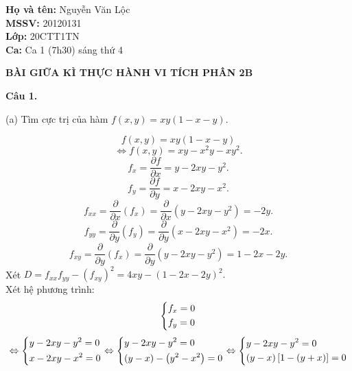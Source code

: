 \documentclass[12pt,a4paper]{article}
\author{Nguyễn Văn Lộc}
\begin{document}
\fancyhf{}
\lhead{}
\chead{}
\rhead{}
\cfoot{\thepage}
\rfoot{}
\lfoot{}
\pagestyle{fancy}
\begin{flushleft}
\begin{mybox}
\textbf{Họ và tên:} Nguyễn Văn Lộc\\
\textbf{MSSV:} 20120131\\ 
\textbf{Lớp:} 20CTT1TN\\
\textbf{Ca:} Ca 1 (7h30) sáng thứ 4
\end{mybox}
\end{flushleft}
\begin{center}
\textbf{BÀI GIỮA KÌ THỰC HÀNH VI TÍCH PHÂN 2B}
\end{center}
\textbf{Câu 1.}\\
\begin{mybox}
(a) Tìm cực trị của hàm \(f\left( {x,y} \right) = xy\left( {1 - x - y} \right).\) \\
\end{mybox}
\[f\left( {x,y} \right) = xy\left( {1 - x - y} \right)\]
\[ \Leftrightarrow f\left( {x,y} \right) = xy - {x^2}y - x{y^2}.\]
\[{f_x} = \frac{{\partial f}}{{\partial x}} = y - 2xy - {y^2}.\]
\[{f_y} = \frac{{\partial f}}{{\partial y}} = x - 2xy - {x^2}.\]
\[{f_{xx}} = \frac{\partial }{{\partial x}}\left( {{f_x}} \right) = \frac{\partial }{{\partial x}}\left( {y - 2xy - {y^2}} \right) =  - 2y.\]
\[{f_{yy}} = \frac{\partial }{{\partial y}}\left( {{f_y}} \right) = \frac{\partial }{{\partial y}}\left( {x - 2xy - {x^2}} \right) =  - 2x.\]
\[{f_{xy}} = \frac{\partial }{{\partial y}}\left( {{f_x}} \right) = \frac{\partial }{{\partial y}}\left( {y - 2xy - {y^2}} \right) = 1 - 2x - 2y.\]
Xét \(D = {f_{xx}}{f_{yy}} - {\left( {{f_{xy}}} \right)^2} = 4xy - {\left( {1 - 2x - 2y} \right)^2}.\)\\
Xét hệ phương trình:
\begin{equation} 
\left\{ \begin{gathered}
  {f_x} = 0 \hfill \\
  {f_y} = 0 \hfill \\ 
\end{gathered}  \right.
\label{hptdhr}
\end{equation}
\[ \Leftrightarrow \left\{ \begin{gathered}
  y - 2xy - {y^2} = 0 \hfill \\
  x - 2xy - {x^2} = 0 \hfill \\ 
\end{gathered}  \right. \Leftrightarrow \left\{ \begin{gathered}
  y - 2xy - {y^2} = 0 \hfill \\
  \left( {y - x} \right) - \left( {{y^2} - {x^2}} \right) = 0 \hfill \\ 
\end{gathered}  \right. \Leftrightarrow \left\{ \begin{gathered}
  y - 2xy - {y^2} = 0 \hfill \\
  \left( {y - x} \right)\left[ {1 - \left( {y + x} \right)} \right] = 0 \hfill \\ 
\end{gathered}  \right.\]
\end{document}
